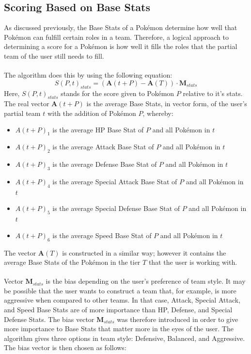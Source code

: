 \documentclass{article}
\begin{document}
\subsection{Scoring Based on Base Stats}\label{scoringBaseStats}
As discussed previously, the Base Stats of a Pok\'emon determine how well that Pok\'emon can fulfill certain roles in a team. Therefore, a logical approach to determining a score for a Pok\'emon is how well it fills the roles that the partial team of the user still needs to fill.\\\\
The algorithm does this by using the following equation:
\begin{equation}\label{statsScoreEqn}
	S(P,t)_{stats}=(\textbf{A}(t+P)-\textbf{A}(T))\cdot\textbf{M}_{stats}
\end{equation}
Here, $S(P,t)_{stats}$ stands for the score given to Pok\'emon $P$ relative to it's stats. The real vector $\textbf{A}(t+P)$ is the average Base Stats, in vector form, of the user's partial team $t$ with the addition of Pok\'emon $P$, whereby:
\begin{itemize}
	\item $A(t+P)_1$ is the average HP Base Stat of $P$ and all Pok\'emon in $t$
	\item $A(t+P)_2$ is the average Attack Base Stat of $P$ and all Pok\'emon in $t$
	\item $A(t+P)_3$ is the average Defense Base Stat of $P$ and all Pok\'emon in $t$
	\item $A(t+P)_4$ is the average Special Attack Base Stat of $P$ and all Pok\'emon in $t$
	\item $A(t+P)_5$ is the average Special Defense Base Stat of $P$ and all Pok\'emon in $t$
	\item $A(t+P)_6$ is the average Speed Base Stat of $P$ and all Pok\'emon in $t$
\end{itemize}
The vector $\textbf{A}(T)$ is constructed in a similar way; however it contains the average Base Stats of the Pok\'emon in the tier $T$ that the user is working with.\\\\
Vector $\textbf{M}_{stats}$ is the bias depending on the user's preference of team style. It may be possible that the user wants to construct a team that, for example, is more aggressive when compared to other teams. In that case, Attack, Special Attack, and Speed Base Stats are of more importance than HP, Defense, and Special Defense Stats. The bias vector $\textbf{M}_{stats}$ was therefore introduced in order to give more importance to Base Stats that matter more in the eyes of the user. The algorithm gives three options in team style: Defensive, Balanced, and Aggressive. The bias vector is then chosen as follows:
\end{document}
